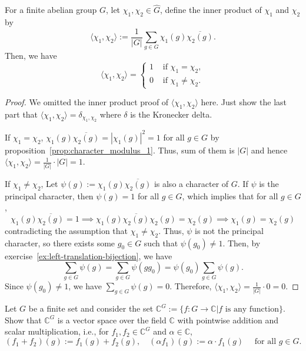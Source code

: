 \documentclass{elegantbook}
\begin{document}
\begin{theorem} \label{thm:orthogonality_relations_of_characters}
  For a finite abelian group $G$, let $\chi_1,\chi_2\in \widehat{G}$, define the inner product of $\chi_1$ and $\chi_2$ by
  \[
    \langle \chi_1, \chi_2 \rangle := \frac{1}{|G|} \sum_{g \in G} \chi_1(g) \overline{\chi_2(g)}.
  \]
  Then, we have
  \[
    \langle \chi_1, \chi_2 \rangle = \begin{cases}
      1 & \text{ if } \chi_1 = \chi_2, \\
      0 & \text{ if } \chi_1 \ne \chi_2.
    \end{cases}
  \]
\end{theorem}

\begin{proof}
  We omitted the inner product proof of $\langle \chi_1, \chi_2 \rangle$ here. Just show the last part that $\langle \chi_1, \chi_2 \rangle = \delta_{\chi_1,\chi_2}$ where $\delta$ is the Kronecker delta.

  If $\chi_1 = \chi_2$, $\chi_1(g) \overline{\chi_2(g)} = |\chi_1(g)|^2 = 1$ for all $g \in G$ by proposition~\ref{prop:character_modulus_1}. Thus, sum of them is $|G|$ and hence $\langle \chi_1, \chi_2 \rangle = \frac{1}{|G|} \cdot |G| = 1$.

  If $\chi_1 \ne \chi_2$, Let $\psi(g) := \chi_1(g) \overline{\chi_2(g)}$ is also a character of $G$. If $\psi$ is the principal character, then $\psi(g)=1$ for all $g \in G$, which implies that for all $g \in G$,
  \[
    \chi_1(g)\overline{\chi_2(g)} = 1 \implies \chi_1(g)\overline{\chi_2(g)}\chi_2(g) = \chi_2(g) \implies \chi_1(g) = \chi_2(g)
  \]
  contradicting the assumption that $\chi_1 \ne \chi_2$. Thus, $\psi$ is not the principal character, so there exists some $g_0 \in G$ such that $\psi(g_0) \ne 1$. Then, by exercise~\ref{ex:left-translation-bijection}, we have
  \[
    \sum_{g \in G} \psi(g) = \sum_{g \in G} \psi(g g_0) = \psi(g_0) \sum_{g \in G} \psi(g).
  \]
  Since $\psi(g_0) \ne 1$, we have $\sum_{g \in G} \psi(g) = 0$. Therefore, $\langle \chi_1, \chi_2 \rangle = \frac{1}{|G|} \cdot 0 = 0$.
\end{proof}

\begin{exercise} \label{ex:vector_space_of_functions}
  Let $G$ be a finite set and consider the set $\mathbb{C}^{G}:=\{ f : G \to \mathbb{C} | f \text{ is any function} \}$. Show that $\mathbb{C}^{G}$ is a vector space over the field $\mathbb{C}$ with pointwise addition and scalar multiplication, i.e., for $f_1,f_2\in \mathbb{C}^{G}$ and $\alpha\in \mathbb{C}$, 
  \[
    (f_1 + f_2)(g) := f_1(g) + f_2(g), \quad (\alpha f_1)(g) := \alpha \cdot f_1(g) \quad \text{ for all } g \in G.
  \]
\end{exercise}
\end{document}
